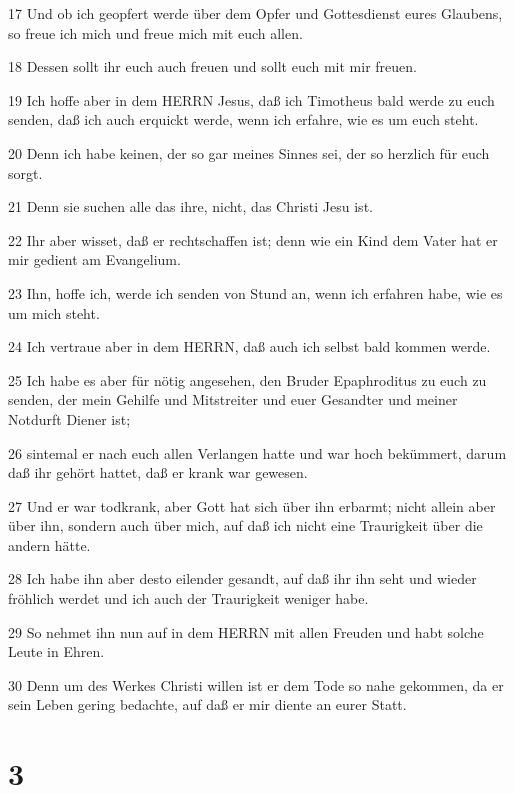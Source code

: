 \par 17 Und ob ich geopfert werde über dem Opfer und Gottesdienst eures Glaubens, so freue ich mich und freue mich mit euch allen.
\par 18 Dessen sollt ihr euch auch freuen und sollt euch mit mir freuen.
\par 19 Ich hoffe aber in dem HERRN Jesus, daß ich Timotheus bald werde zu euch senden, daß ich auch erquickt werde, wenn ich erfahre, wie es um euch steht.
\par 20 Denn ich habe keinen, der so gar meines Sinnes sei, der so herzlich für euch sorgt.
\par 21 Denn sie suchen alle das ihre, nicht, das Christi Jesu ist.
\par 22 Ihr aber wisset, daß er rechtschaffen ist; denn wie ein Kind dem Vater hat er mir gedient am Evangelium.
\par 23 Ihn, hoffe ich, werde ich senden von Stund an, wenn ich erfahren habe, wie es um mich steht.
\par 24 Ich vertraue aber in dem HERRN, daß auch ich selbst bald kommen werde.
\par 25 Ich habe es aber für nötig angesehen, den Bruder Epaphroditus zu euch zu senden, der mein Gehilfe und Mitstreiter und euer Gesandter und meiner Notdurft Diener ist;
\par 26 sintemal er nach euch allen Verlangen hatte und war hoch bekümmert, darum daß ihr gehört hattet, daß er krank war gewesen.
\par 27 Und er war todkrank, aber Gott hat sich über ihn erbarmt; nicht allein aber über ihn, sondern auch über mich, auf daß ich nicht eine Traurigkeit über die andern hätte.
\par 28 Ich habe ihn aber desto eilender gesandt, auf daß ihr ihn seht und wieder fröhlich werdet und ich auch der Traurigkeit weniger habe.
\par 29 So nehmet ihn nun auf in dem HERRN mit allen Freuden und habt solche Leute in Ehren.
\par 30 Denn um des Werkes Christi willen ist er dem Tode so nahe gekommen, da er sein Leben gering bedachte, auf daß er mir diente an eurer Statt.

\chapter{3}

